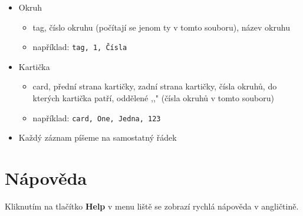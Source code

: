 \documentclass[12pt]{article}
\providecommand{\tightlist}{\setlength{\itemsep}{1pt}\setlength{\parskip}{1pt}}
\let\oldtexttt\texttt
\renewcommand{\texttt}[1]{\oldtexttt{\textcolor{codehighlight}{#1}}}
\begin{document}
\begin{itemize}
\tightlist
\item
  Okruh

  \begin{itemize}
  \tightlist
  \item
    tag, číslo okruhu (počítají se jenom ty v tomto souboru), název
    okruhu
  \item
    například: \texttt{tag,\ 1,\ Čísla}
  \end{itemize}
\item
  Kartička

  \begin{itemize}
  \tightlist
  \item
    card, přední strana kartičky, zadní strana kartičky, čísla okruhů,
    do kterých kartička patří, oddělené ,,\textbar{}" (čísla okruhů v
    tomto souboru)
  \item
    například: \texttt{card,\ One,\ Jedna,\ 1\textbar{}2\textbar{}3}
  \end{itemize}
\item
  Každý záznam píšeme na samostatný řádek
\end{itemize}

\hypertarget{nuxe1povux11bda}{%
\section{Nápověda}\label{nuxe1povux11bda}}

Kliknutím na tlačítko \textbf{Help} v menu liště se zobrazí rychlá
nápověda v angličtině.
\end{document}
